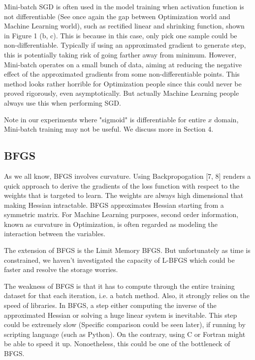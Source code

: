 \documentclass{article} %
\begin{document}
\begin{itemize}
   Mini-batch SGD is often used in the model training when activation function is not differentiable (See once again the gap between Optimization world and Machine Learning world), such as rectified linear and shrinking function, shown in Figure 1 (b, c). This is because in this case, only pick one sample could be non-differentiable. Typically if using an approximated gradient to generate step, this is potentially taking risk of going farther away from minimum. However, Mini-batch operates on a small bunch of data, aiming at reducing the negative effect of the approximated gradients from some non-differentiable points. This method looks rather horrible for Optimization people since this could never be proved rigorously, even asymptotically. But actually Machine Learning people always use this when performing SGD.

   Note in our experiments where "sigmoid" is differentiable for entire $x$ domain,  Mini-batch training may not be useful. We discuss more in Section 4.
\end{itemize}

\subsection{BFGS}
As we all know, BFGS involves curvature. Using Backpropogation [7, 8] renders a quick approach to derive the gradients of the loss function with respect to the weights that is targeted to learn. The weights are always high dimensional that making Hessian intractable. BFGS approximates Hessian starting from a symmetric matrix. For Machine Learning purposes, second order information, known as curvature in Optimization, is often regarded as modeling the interaction between the variables.

The extension of BFGS is the Limit Memory BFGS. But unfortunately as time is constrained, we haven't investigated the capacity of L-BFGS which could be faster and resolve the storage worries. 

The weakness of BFGS is that it has to compute through the entire training dataset for that each iteration, i.e. a batch method. Also, it strongly relies on the speed of libraries. In BFGS, a step either computing the inverse of the approximated Hessian or solving a huge linear system is inevitable. This step could be extremely slow (Specific comparison could be seen later), if running by scripting language (such as Python). On the contrary, using C or Fortran might be able to speed it up. Nonoetheless, this could be one of the bottleneck of BFGS.
\end{document}
